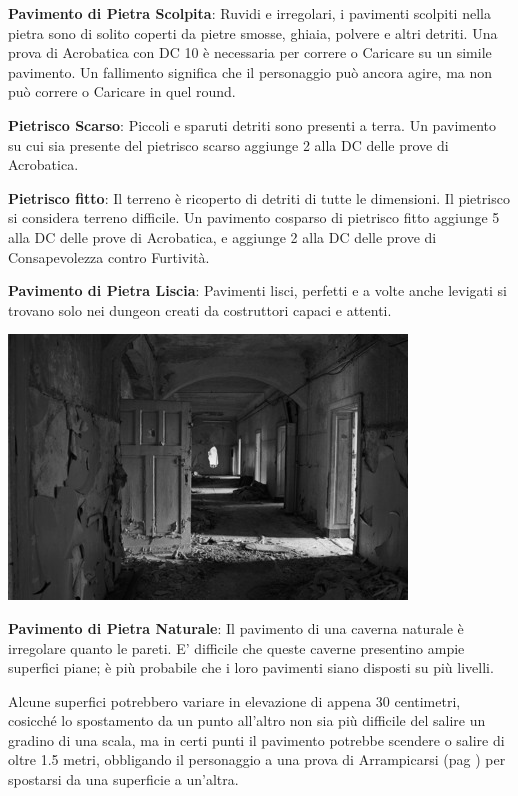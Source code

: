 \begin{multicols}{2}
\textbf{Pavimento di Pietra Scolpita}: Ruvidi e irregolari, i pavimenti scolpiti nella pietra sono di solito coperti da pietre smosse, ghiaia, polvere e altri detriti. Una prova di Acrobatica con DC 10 è necessaria per correre o Caricare su un simile pavimento. Un fallimento significa che il personaggio può ancora agire, ma non può correre o Caricare in quel round.

\textbf{Pietrisco Scarso}: Piccoli e sparuti detriti sono presenti a terra. Un pavimento su cui sia presente del pietrisco scarso aggiunge 2 alla DC delle prove di Acrobatica.

\textbf{Pietrisco fitto}: Il terreno è ricoperto di detriti di tutte le dimensioni. Il pietrisco si considera terreno difficile. Un pavimento cosparso di pietrisco fitto aggiunge 5 alla DC delle prove di Acrobatica, e aggiunge 2 alla DC delle prove di Consapevolezza contro Furtività.

\textbf{Pavimento di Pietra Liscia}: Pavimenti lisci, perfetti e a volte anche levigati si trovano solo nei dungeon creati da costruttori capaci e attenti.

\medskip

\begin{center}
	\includegraphics[width=0.9\linewidth]{immagini/pavimento_grey.png}
\end{center}

\medskip

\textbf{Pavimento di Pietra Naturale}: Il pavimento di una caverna naturale è irregolare quanto le pareti. E' difficile che queste caverne presentino ampie superfici piane; è più probabile che i loro pavimenti siano disposti su più livelli.

Alcune superfici potrebbero variare in elevazione di appena 30 centimetri, cosicché lo spostamento da un punto all'altro non sia più difficile del salire un gradino di una scala, ma in certi punti il pavimento potrebbe scendere o salire di oltre 1.5 metri, obbligando il personaggio a una prova di Arrampicarsi (pag \pageref{arrampicarsi}) per spostarsi da una superficie a un'altra.


\end{multicols}
